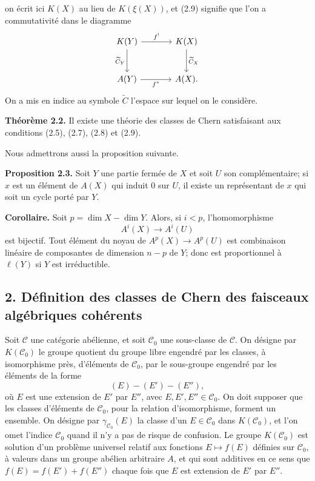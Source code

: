 \documentclass[11pt]{article}
\providecommand{\Ctil}{\widetilde C}
\providecommand{\cC}{\mathcal C}
\providecommand{\ellc}{\ell}
\begin{document}
on écrit ici $K(X)$ au lieu de $K(\xi(X))$, et (2.9) signifie que l'on a commutativité dans le diagramme
\[
\begin{tikzcd}[column sep=large,row sep=large]
K(Y) \arrow[r,"f^!"] \arrow[d,"\Ctil_Y"'] & K(X) \arrow[d,"\Ctil_X"]\\
A(Y) \arrow[r,"f^*"'] & A(X).
\end{tikzcd}
\]
On a mis en indice au symbole $\Ctil$ l'espace sur lequel on le considère.

\textbf{Théorème 2.2.} Il existe une théorie des classes de Chern satisfaisant aux conditions (2.5), (2.7), (2.8) et (2.9).

Nous admettrons aussi la proposition suivante.

\textbf{Proposition 2.3.} Soit $Y$ une partie fermée de $X$ et soit $U$ son complémentaire; si $x$ est un élément de $A(X)$ qui induit $0$ sur $U$, il existe un représentant de $x$ qui soit un cycle porté par $Y$.

\textbf{Corollaire.} Soit $p=\dim X-\dim Y$. Alors, si $i<p$, l'homomorphisme
\[
 A^i(X)\longrightarrow A^i(U)
\]
est bijectif. Tout élément du noyau de $A^p(X)\to A^p(U)$ est combinaison linéaire de composantes de dimension $n-p$ de $Y$; donc est proportionnel à $\ellc(Y)$ si $Y$ est irréductible.

\subsection*{2. Définition des classes de Chern des faisceaux algébriques cohérents}

Soit $\cC$ une catégorie abélienne, et soit $\cC_0$ une sous-classe de $\cC$. On désigne par $K(\cC_0)$ le groupe quotient du groupe libre engendré par les classes, à isomorphisme près, d'éléments de $\cC_0$, par le sous-groupe engendré par les éléments de la forme
\[
(E)-(E')-(E''),
\]
où $E$ est une extension de $E'$ par $E''$, avec $E,E',E''\in\cC_0$. On doit supposer que les classes d'éléments de $\cC_0$, pour la relation d'isomorphisme, forment un ensemble. On désigne par $\gamma_{\cC_0}(E)$ la classe d'un $E\in\cC_0$ dans $K(\cC_0)$, et l'on omet l'indice $\cC_0$ quand il n'y a pas de risque de confusion. Le groupe $K(\cC_0)$ est solution d'un problème universel relatif aux fonctions $E\mapsto f(E)$ définies sur $\cC_0$, à valeurs dans un groupe abélien arbitraire $A$, et qui sont additives en ce sens que $f(E)=f(E')+f(E'')$ chaque fois que $E$ est extension de $E'$ par $E''$.
\end{document}
